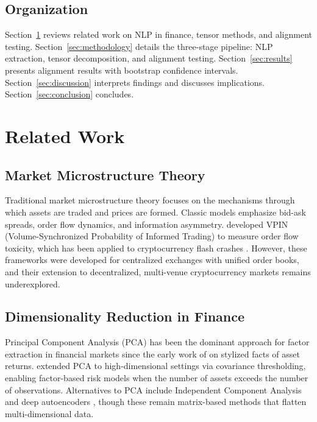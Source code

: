 \documentclass[11pt,twocolumn]{article}
\begin{document}
\subsection{Organization}

Section~\ref{sec:related} reviews related work on NLP in finance, tensor methods, and alignment testing. Section~\ref{sec:methodology} details the three-stage pipeline: NLP extraction, tensor decomposition, and alignment testing. Section~\ref{sec:results} presents alignment results with bootstrap confidence intervals. Section~\ref{sec:discussion} interprets findings and discusses implications. Section~\ref{sec:conclusion} concludes.

\section{Related Work}
\label{sec:related}

\subsection{Market Microstructure Theory}

Traditional market microstructure theory \citep{OHara1995Market,Hasbrouck2007Empirical} focuses on the mechanisms through which assets are traded and prices are formed. Classic models emphasize bid-ask spreads, order flow dynamics, and information asymmetry. \citet{Easley2012Flow} developed VPIN (Volume-Synchronized Probability of Informed Trading) to measure order flow toxicity, which has been applied to cryptocurrency flash crashes \citep{Easley2024CrossAsset}. However, these frameworks were developed for centralized exchanges with unified order books, and their extension to decentralized, multi-venue cryptocurrency markets remains underexplored.

\subsection{Dimensionality Reduction in Finance}

Principal Component Analysis (PCA) has been the dominant approach for factor extraction in financial markets since the early work of \citet{Cont2001Empirical} on stylized facts of asset returns. \citet{Fan2013Large} extended PCA to high-dimensional settings via covariance thresholding, enabling factor-based risk models when the number of assets exceeds the number of observations. Alternatives to PCA include Independent Component Analysis \citep{Back1997First} and deep autoencoders \citep{Heaton2017Deep}, though these remain matrix-based methods that flatten multi-dimensional data.
\end{document}
